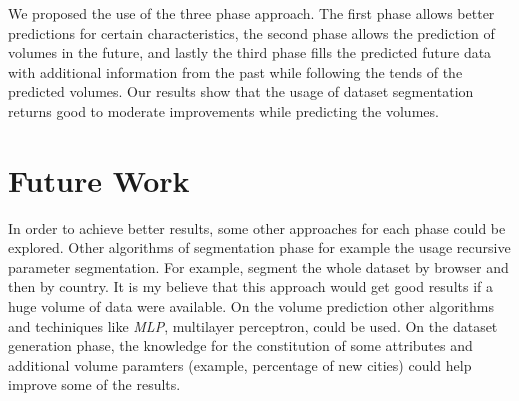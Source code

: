 \documentclass[9pt,a4paper]{extarticle}
\begin{document}
\begin{multicols}{2}
We proposed the use of the three phase approach. The
first phase allows better predictions for certain characteristics, the second
phase allows the prediction of volumes in the future, and lastly the third phase
fills the predicted future data with additional information from the past while
following the tends of the predicted volumes.
Our results show that the usage of dataset segmentation returns good to moderate
improvements while predicting the volumes.

\section{Future Work}

In order to achieve better results, some other approaches for each phase
could be explored. Other algorithms of segmentation phase for example the usage
recursive parameter segmentation. For example, segment the whole dataset by
browser and then by country. It is my believe that this approach would get good
results if a huge volume of data were available.
On the volume prediction other algorithms and techiniques like \emph{MLP},
multilayer perceptron, could be used.
On the dataset generation phase, the knowledge for the constitution of some
attributes and additional volume paramters (example, percentage of new cities)
could help improve some of the results.



\end{multicols}
\end{document}

